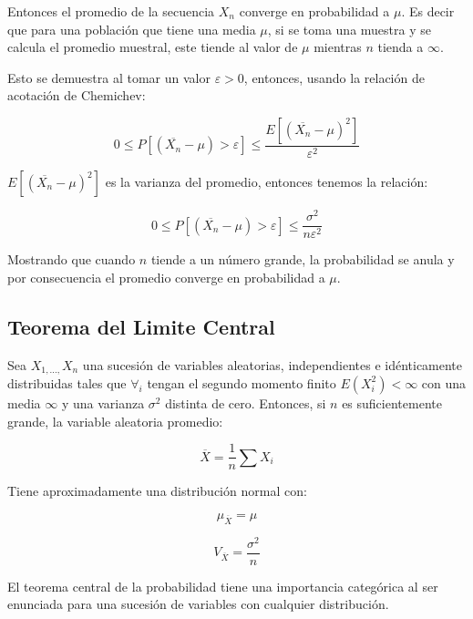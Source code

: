 \documentclass{rbf}
\begin{document}
Entonces el promedio de la secuencia $X_n$ converge en probabilidad a $\mu$. Es decir que para una población que tiene una media $\mu$, si se toma una muestra y se calcula el promedio muestral, este tiende al valor de $\mu$ mientras $n$ tienda a $\infty$. 

Esto se demuestra al tomar un valor $\varepsilon> 0$, entonces, usando la relación de acotación de Chemichev:

\begin{equation}
  \displaystyle   0\leq P[(\overline{X_n}-\mu)>\varepsilon] \leq \frac{E[(\overline{X_n}-\mu)^2]}{\varepsilon^2}
\end{equation}

$E[(\overline{X_n}-\mu)^2]$ es la varianza del promedio, entonces tenemos la relación:

\begin{equation}
  \displaystyle   0\leq P[(\overline{X_n}-\mu)>\varepsilon] \leq \frac{\sigma^2}{n\varepsilon^2}
\end{equation}

Mostrando que cuando $n$ tiende a un número grande, la probabilidad se anula y por consecuencia el promedio converge en probabilidad a $\mu$.

\subsection{Teorema del Limite Central}
Sea $X_{1,...,} X_n$ una sucesión de variables aleatorias, independientes e idénticamente distribuidas tales que $\forall_i$  tengan el segundo momento finito  $E(X_i^2)<\infty$ con una media $\infty$ y una varianza $\sigma^2$ distinta de cero. Entonces, si $n$ es suficientemente grande, la variable aleatoria promedio:

\begin{equation}
  \displaystyle   \overline{X}=\frac{1}{n}\sum X_i
\end{equation}

Tiene aproximadamente una distribución normal con:

\begin{equation}
 \displaystyle    \mu_{\overline{X}} =\mu
\end{equation}

\begin{equation}
  \displaystyle   V_{\overline{X}} =\frac{\sigma^2}{n}
\end{equation}

El teorema central de la probabilidad tiene una importancia categórica al ser enunciada para una sucesión de variables con cualquier distribución. 
\end{document}
